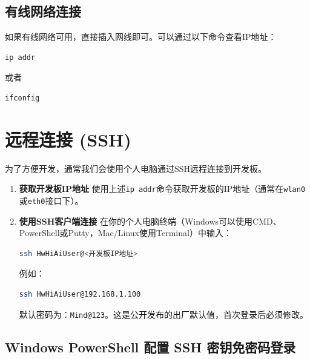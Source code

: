 \subsection{有线网络连接}\label{src-appendix-appendix1-h20}

如果有线网络可用，直接插入网线即可。可以通过以下命令查看IP地址：

\begin{lstlisting}[language=bash]
ip addr
\end{lstlisting}

或者

\begin{lstlisting}[language=bash]
ifconfig
\end{lstlisting}

\section{远程连接 (SSH)}\label{src-appendix-appendix1-h21}

为了方便开发，通常我们会使用个人电脑通过SSH远程连接到开发板。

\begin{enumerate}
\def\labelenumi{\arabic{enumi}.}
\item
  \textbf{获取开发板IP地址}
  使用上述\passthrough{\lstinline!ip addr!}命令获取开发板的IP地址（通常在\passthrough{\lstinline!wlan0!}或\passthrough{\lstinline!eth0!}接口下）。
\item
  \textbf{使用SSH客户端连接}
  在你的个人电脑终端（Windows可以使用CMD、PowerShell或Putty，Mac/Linux使用Terminal）中输入：

\begin{lstlisting}[language=bash]
ssh HwHiAiUser@<开发板IP地址>
\end{lstlisting}

  例如：

\begin{lstlisting}[language=bash]
ssh HwHiAiUser@192.168.1.100
\end{lstlisting}

  默认密码为：\passthrough{\lstinline!Mind@123!}。这是公开发布的出厂默认值，首次登录后必须修改。
\end{enumerate}

\subsection{Windows PowerShell 配置 SSH
密钥免密码登录}\label{src-appendix-appendix1-h21-key-login}


